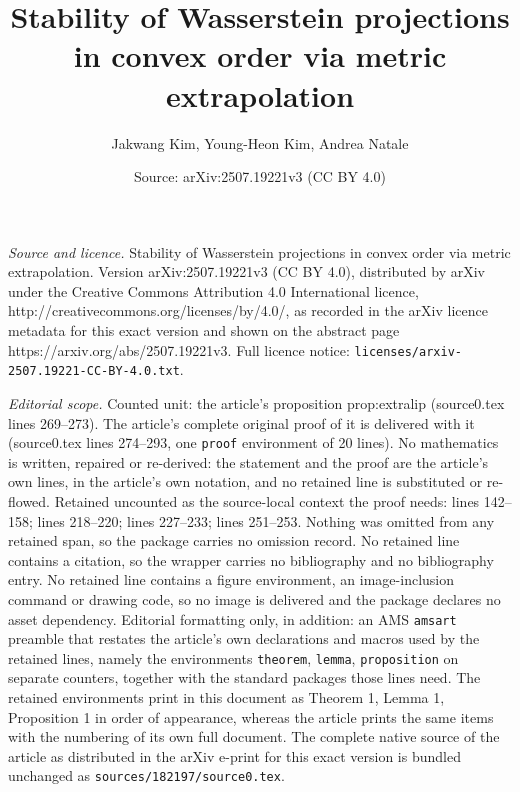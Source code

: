 \documentclass[10pt,a4paper]{amsart}
\title{Stability of Wasserstein projections in convex order via metric extrapolation}
\author{Jakwang Kim, Young-Heon Kim, Andrea Natale}
\date{Source: arXiv:2507.19221v3 (CC BY 4.0)}
\begin{document}
\maketitle

\noindent\emph{Source and licence.} Stability of Wasserstein projections in convex order via metric extrapolation. Version arXiv:2507.19221v3 (CC BY 4.0), distributed by arXiv under the Creative Commons Attribution 4.0 International licence, http://creativecommons.org/licenses/by/4.0/, as recorded in the arXiv licence metadata for this exact version and shown on the abstract page https://arxiv.org/abs/2507.19221v3. Full licence notice: \texttt{licenses/arxiv-2507.19221-CC-BY-4.0.txt}.\par\smallskip

\noindent\textit{Editorial scope.} Counted unit: the article's proposition prop:extralip (source0.tex lines 269--273). The article's complete original proof of it is delivered with it (source0.tex lines 274--293, one \texttt{proof} environment of 20 lines). No mathematics is written, repaired or re-derived: the statement and the proof are the article's own lines, in the article's own notation, and no retained line is substituted or re-flowed.  Retained uncounted as the source-local context the proof needs: lines 142--158; lines 218--220; lines 227--233; lines 251--253.  Nothing was omitted from any retained span, so the package carries no omission record.  No retained line contains a citation, so the wrapper carries no bibliography and no bibliography entry.  No retained line contains a figure environment, an image-inclusion command or drawing code, so no image is delivered and the package declares no asset dependency.  Editorial formatting only, in addition: an AMS \texttt{amsart} preamble that restates the article's own declarations and macros used by the retained lines, namely the environments \texttt{theorem}, \texttt{lemma}, \texttt{proposition} on separate counters, together with the standard packages those lines need.  The retained environments print in this document as Theorem 1, Lemma 1, Proposition 1 in order of appearance, whereas the article prints the same items with the numbering of its own full document.  The complete native source of the article as distributed in the arXiv e-print for this exact version is bundled unchanged as \texttt{sources/182197/source0.tex}.
\end{document}
